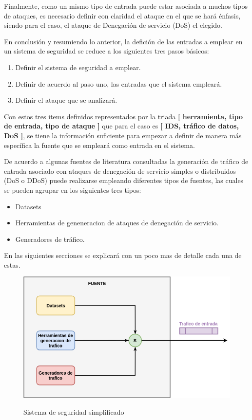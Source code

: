 \documentclass[12pt]{article}
\begin{document}
Finalmente, como un mismo tipo de entrada puede estar asociada a
muchos tipos de ataques, es necesario definir con claridad el ataque
en el que se hará énfasis, siendo para el caso, el ataque de
Denegación de servicio (DoS) el elegido.

En conclusión y resumiendo lo anterior, la defición de las entradas a
emplear en un sistema de seguridad se reduce a los siguientes tres
pasos básicos:
\begin{enumerate}
\item Definir el sistema de seguridad a emplear.
\item Definir de acuerdo al paso uno, las entradas que el sistema
  empleará.
\item Definir el ataque que se analizará.
\end{enumerate}

Con estos tres items definidos representados por la triada \textbf{[
    herramienta, tipo de entrada, tipo de ataque ]} que para el caso
es \textbf{[ IDS, tráfico de datos, DoS ]}, se tiene la información
suficiente para empezar a definir de manera más específica la fuente
que se empleará como entrada en el sistema.

De acuerdo a algunas fuentes de literatura consultadas
\citep{dos_tools,net_attacks_taxonomy} la generación de tráfico de
entrada asociado con ataques de denegación de servicio simples o
distribuidos (DoS o DDoS) puede realizarse empleando diferentes tipos
de fuentes, las cuales se pueden agrupar en los siguientes tres tipos:
 \begin{itemize}
\item Datasets
\item Herramientas de geneneracion de ataques de denegación de
  servicio.
\item Generadores de tráfico.
\end{itemize}

En las siguientes secciones se explicará con un poco mas de detalle
cada una de estas.

\begin{figure}[htbp]
\begin{center}
\includegraphics[scale=0.5]{sources.png}\\[1cm] %
\caption{Sistema de seguridad simplificado}
\end{center}
\end{figure}
\end{document}

